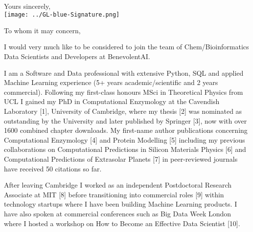 \documentclass[11pt,a4paper,sans]{moderncv}        %
\begin{document}

\clearpage
\recipient{~}{~}
\date{\vspace*{-0cm}~}
\opening{\vspace*{-3cm}~}
\closing{Yours sincerely, \\ \hspace*{-0.3cm}
\texttt{[image: ../GL-blue-Signature.png]} 
\vspace*{-1cm}
}
\makelettertitle
%
To whom it may concern,
					
I would very much like to be considered to join the team of Chem/Bioinformatics Data Scientists and Developers at BenevolentAI.

I am a Software and Data professional with extensive Python, SQL and applied Machine Learning experience (5+ years academic/scientific and 2 years commercial). Following my first-class honours MSci in Theoretical Physics from UCL I gained my PhD in Computational Enzymology at the Cavendish Laboratory [1], University of Cambridge, where my thesis [2] was nominated as outstanding by the University and later published by Springer [3], now with over 1600 combined chapter downloads. My first-name author publications concerning Computational Enzymology [4] and Protein Modelling [5] including my previous collaborations on Computational Predictions in Silicon Materials Physics [6] and Computational Predictions of Extrasolar Planets [7] in peer-reviewed journals have received 50 citations so far.

After leaving Cambridge I worked as an independent Postdoctoral Research Associate at MIT [8] before transitioning into commercial roles [9] within technology startups where I have been building Machine Learning products. I have also spoken at commercial conferences such as Big Data Week London where I hosted a workshop on How to Become an Effective Data Scientist [10].
\end{document}
